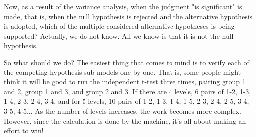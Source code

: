 \documentclass{ltjbook}
\begin{document}


Now, as a result of the variance analysis, when the judgment "is significant" is made, that is, when the null hypothesis is rejected and the alternative hypothesis is adopted, which of the multiple considered alternative hypotheses is being supported? Actually, we do not know. All we know is that it is not the null hypothesis.

So what should we do? The easiest thing that comes to mind is to verify each of the competing hypothesis sub-models one by one. That is, some people might think it will be good to run the independent t-test three times, pairing group 1 and 2, group 1 and 3, and group 2 and 3. If there are 4 levels, 6 pairs of 1-2, 1-3, 1-4, 2-3, 2-4, 3-4, and for 5 levels, 10 pairs of 1-2, 1-3, 1-4, 1-5, 2-3, 2-4, 2-5, 3-4, 3-5, 4-5... As the number of levels increases, the work becomes more complex. However, since the calculation is done by the machine, it's all about making an effort to win!
\end{document}
